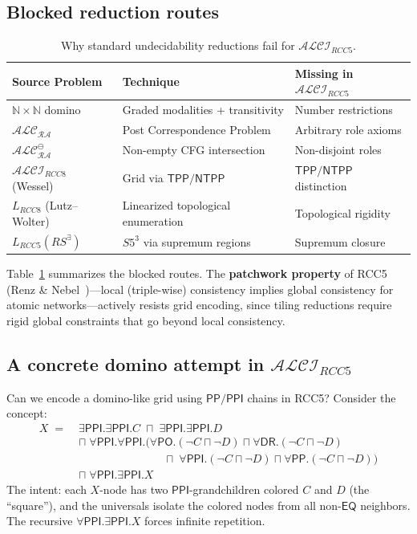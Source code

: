 \documentclass[
]{ceurart}
\theoremstyle{definition}
\newcommand{\ALC}{\ensuremath{\mathcal{ALC}}}
\newcommand{\ALCIRCC}[1]{\ensuremath{\mathcal{ALCI}_{\mathit{RCC#1}}}}
\newcommand{\LRCC}[1]{\ensuremath{L_{\mathit{RCC#1}}}}
\newcommand{\DR}{\ensuremath{\mathsf{DR}}}
\newcommand{\PO}{\ensuremath{\mathsf{PO}}}
\newcommand{\EQ}{\ensuremath{\mathsf{EQ}}}
\newcommand{\PP}{\ensuremath{\mathsf{PP}}}
\newcommand{\PPI}{\ensuremath{\mathsf{PPI}}}
\newcommand{\TPP}{\ensuremath{\mathsf{TPP}}}
\newcommand{\NTPP}{\ensuremath{\mathsf{NTPP}}}
\newcommand{\naturals}{\mathbb{N}}
\begin{document}
\subsection{Blocked reduction routes}

\begin{table}[t]
\caption{Why standard undecidability reductions fail for $\ALCIRCC{5}$.}
\label{tab:blocked}
\begin{tabular}{p{3.0cm}p{3.8cm}p{3.5cm}}
\toprule
\textbf{Source Problem} & \textbf{Technique} & \textbf{Missing in $\ALCIRCC{5}$} \\
\midrule
$\naturals \times \naturals$ domino & Graded modalities + transitivity & Number restrictions \\
$\ALC_{\mathcal{RA}}$ \cite{Wessel2001RA} & Post Correspondence Problem & Arbitrary role axioms \\
$\ALC_{\mathcal{RA}}^\ominus$ \cite{Wessel2000RA} & Non-empty CFG intersection & Non-disjoint roles \\
$\ALCIRCC{8}$ (Wessel) & Grid via $\TPP/\NTPP$ & $\TPP/\NTPP$ distinction \\
$\LRCC{8}$ (Lutz--Wolter) & Linearized topological enumeration & Topological rigidity \\
$\LRCC{5}(\mathit{RS}^\exists)$ & $S5^3$ via supremum regions & Supremum closure \\
\bottomrule
\end{tabular}
\end{table}

Table~\ref{tab:blocked} summarizes the blocked routes.
The \textbf{patchwork property} of RCC5 (Renz \& Nebel~\cite{RenzNebel1999})---local
(triple-wise) consistency implies global consistency for atomic
networks---actively resists grid encoding, since tiling reductions
require rigid global constraints that go beyond local consistency.

\subsection{A concrete domino attempt in $\ALCIRCC{5}$}
\label{sec:domino-attempt}

Can we encode a domino-like grid using $\PP/\PPI$ chains in RCC5?
Consider the concept:
\begin{align*}
  X \;=\; &\exists\PPI.\exists\PPI.C \;\sqcap\; \exists\PPI.\exists\PPI.D \\
  &\sqcap\; \forall\PPI.\forall\PPI.(\forall\PO.(\neg C \sqcap \neg D)
    \sqcap \forall\DR.(\neg C \sqcap \neg D) \\
  &\qquad\qquad\qquad\quad\;\;
    \sqcap\; \forall\PPI.(\neg C \sqcap \neg D)
    \sqcap \forall\PP.(\neg C \sqcap \neg D)) \\
  &\sqcap\; \forall\PPI.\exists\PPI.X
\end{align*}
The intent: each $X$-node has two $\PPI$-grandchildren colored $C$
and $D$ (the ``square''), and the universals isolate the colored
nodes from all non-$\EQ$ neighbors.  The recursive
$\forall\PPI.\exists\PPI.X$ forces infinite repetition.
\end{document}
